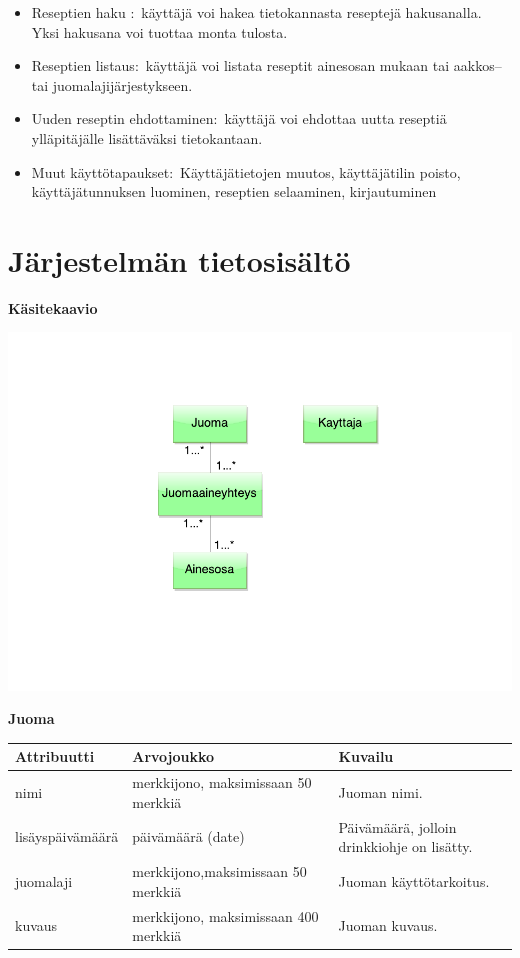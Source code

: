 \documentclass[a4paper]{article}
\begin{document}
\begin{itemize}
	\item Reseptien haku \(\colon\) käyttäjä voi hakea tietokannasta reseptejä hakusanalla. Yksi hakusana voi tuottaa monta tulosta.
	\item Reseptien listaus\(\colon\) käyttäjä voi listata reseptit ainesosan mukaan tai aakkos-- tai juomalajijärjestykseen.
	\item Uuden reseptin ehdottaminen\(\colon\) käyttäjä voi ehdottaa uutta reseptiä ylläpitäjälle lisättäväksi tietokantaan.
	\item Muut käyttötapaukset\(\colon\) Käyttäjätietojen muutos, käyttäjätilin poisto, käyttäjätunnuksen luominen, reseptien selaaminen, kirjautuminen
\end{itemize}

\newpage
\section{Järjestelmän tietosisältö}
\begin{flushleft}\textbf{Käsitekaavio} \end{flushleft}

\includegraphics[scale=0.8]{kasitekaavio.pdf}

\begin{flushleft}\textbf{Juoma} \end{flushleft}
\begin{flushleft}
	\begin{tabular}{|l|l|l|}\hline
			Attribuutti      & Arvojoukko        & Kuvailu\\
			\hline
			nimi & merkkijono, maksimissaan 50 merkkiä & Juoman nimi.\\ 
			\hline		
			lisäyspäivämäärä & päivämäärä (date) & Päivämäärä, jolloin drinkkiohje on lisätty.\\ 
			\hline			
			juomalaji    & merkkijono,maksimissaan 50 merkkiä  & Juoman käyttötarkoitus. \\ 
			\hline
			kuvaus    & merkkijono, maksimissaan 400 merkkiä & Juoman kuvaus. \\ 
				\hline
	\end{tabular}
\end{flushleft}
\end{document}
